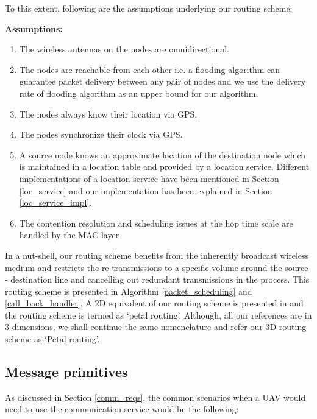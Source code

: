 To this extent, following are the assumptions underlying our routing scheme:

\textbf{Assumptions:}
\begin{enumerate}
\item The wireless antennas on the nodes are omnidirectional.
\item The nodes are reachable from each other i.e. a flooding algorithm can guarantee packet delivery between any pair of nodes and we use the delivery rate of flooding algorithm as an upper bound for our algorithm.
\item The nodes always know their location via GPS. 
\item The nodes synchronize their clock via GPS.
\item A source node knows an approximate location of the destination node which is maintained in a location table and provided by a location service. Different implementations of a location service have been mentioned in Section \ref{loc_service} and our implementation has been explained in Section \ref{loc_service_impl}. 
\item The contention resolution and scheduling issues at the hop time scale are handled by the MAC layer
\end{enumerate}

In a nut-shell, our routing scheme benefits from the inherently broadcast wireless medium and restricts the re-transmissions to a specific volume around the source - destination line and cancelling out redundant transmissions in the process. This routing scheme is presented in Algorithm \ref{packet_scheduling} and \ref{call_back_handler}. A 2D equivalent of our routing scheme is presented in \cite{6133499} and the routing scheme is termed as `petal routing'. Although, all our references are in 3 dimensions, we shall continue the same nomenclature and refer our 3D routing scheme as `Petal routing'.


\subsection{Message primitives} \label{message_primitives}

As discussed in Section \ref{comm_reqs}, the common scenarios when a UAV would need to use the communication service would be the following:

